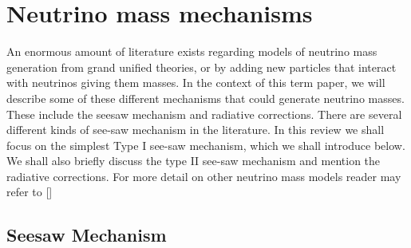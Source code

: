 \section{\label{sec:mass_mechanism}Neutrino mass mechanisms}
An enormous amount of literature exists regarding models of neutrino mass generation from grand unified theories, or by adding new particles that interact with neutrinos giving them masses. In the context of this term paper, we will describe some of these different mechanisms that could generate neutrino masses. These include the seesaw mechanism and radiative corrections. There are several different kinds of see-saw mechanism in the literature. In this review we shall focus on the simplest Type I see-saw mechanism, which we shall introduce below. We shall also briefly discuss the type II see-saw mechanism and mention the radiative corrections. For more detail on other neutrino mass models reader may refer to []
\subsection{\label{subsec:seesaw_mechanism}Seesaw Mechanism}

